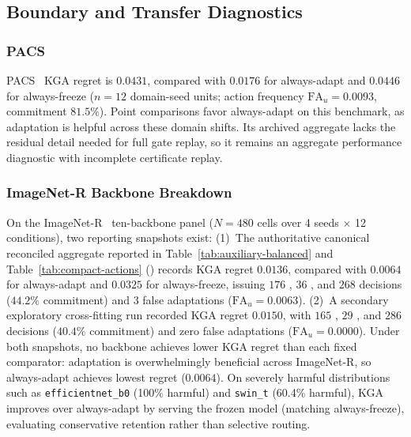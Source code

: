 \subsection{Boundary and Transfer Diagnostics}

\subsubsection{PACS}

PACS~\cite{li2017pacs} KGA regret is $0.0431$, compared with $0.0176$ for always-adapt and $0.0446$ for always-freeze ($n=12$ domain-seed units; action frequency $\mathrm{FA}_u = 0.0093$, commitment $81.5\%$). Point comparisons favor always-adapt on this benchmark, as adaptation is helpful across these domain shifts. Its archived aggregate lacks the residual detail needed for full gate replay, so it remains an aggregate performance diagnostic with incomplete certificate replay.

\subsubsection{ImageNet-R Backbone Breakdown}
\label{app:architecture-generalization}

On the ImageNet-R~\cite{hendrycks2021manyfaces} ten-backbone panel ($N=480$ cells over 4 seeds $\times$ 12 conditions), two reporting snapshots exist: (1)~The authoritative canonical reconciled aggregate reported in Table~\ref{tab:auxiliary-balanced} and Table~\ref{tab:compact-actions} () records KGA regret $0.0136$, compared with $0.0064$ for always-adapt and $0.0325$ for always-freeze, issuing $176$ \adapt, $36$ \freeze, and $268$ \abstain decisions ($44.2\%$ commitment) and $3$ false adaptations ($\mathrm{FA}_u = 0.0063$). (2)~A secondary exploratory cross-fitting run recorded KGA regret $0.0150$, with $165$ \adapt, $29$ \freeze, and $286$ \abstain decisions ($40.4\%$ commitment) and zero false adaptations ($\mathrm{FA}_u = 0.0000$). Under both snapshots, no backbone achieves lower KGA regret than each fixed comparator: adaptation is overwhelmingly beneficial across ImageNet-R, so always-adapt achieves lowest regret ($0.0064$). On severely harmful distributions such as \texttt{efficientnet\_b0} (100\% harmful) and \texttt{swin\_t} (60.4\% harmful), KGA improves over always-adapt by serving the frozen model (matching always-freeze), evaluating conservative retention rather than selective routing.



